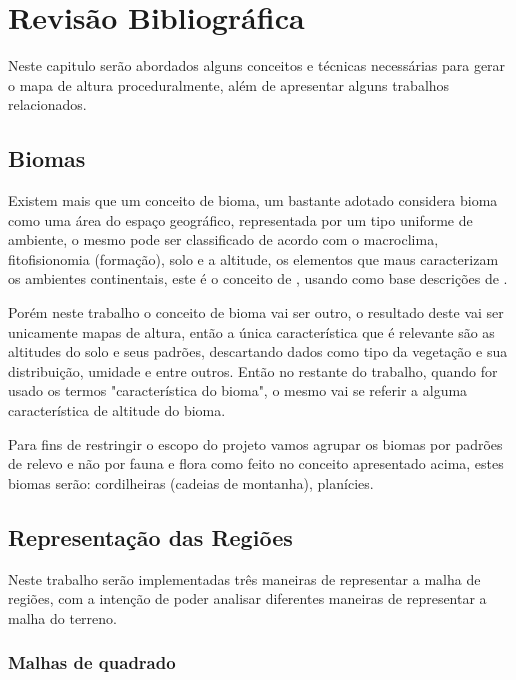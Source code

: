 \chapter{Revisão Bibliográfica}
Neste capitulo serão abordados alguns conceitos e técnicas necessárias para
gerar o mapa de altura proceduralmente, além de apresentar alguns trabalhos
relacionados.

\section{Biomas} %
Existem mais que um conceito de bioma, um bastante adotado considera bioma como
uma área do espaço geográfico, representada por um tipo uniforme de ambiente, o
mesmo pode ser classificado de acordo com o macroclima, fitofisionomia (formação),
solo e a altitude, os elementos que maus caracterizam os ambientes continentais, 
este é o conceito de \cite{coutinho2006conceito}, usando como base descrições
de \cite{walter1986vegetaccao}.

Porém neste trabalho o conceito de bioma vai ser outro, o resultado deste
vai ser unicamente mapas de altura, então a única característica que é relevante
são as altitudes do solo e seus padrões, descartando dados como tipo da
vegetação e sua distribuição, umidade e entre outros. Então no restante 
do trabalho, quando for usado os termos "característica do bioma", o mesmo vai
se referir a alguma característica de altitude do bioma.

Para fins de restringir o escopo do projeto vamos agrupar os biomas por padrões
de relevo e não por fauna e flora como feito no conceito apresentado acima,
estes biomas serão: cordilheiras (cadeias de montanha), planícies.

\section{Representação das Regiões}
Neste trabalho serão implementadas três maneiras de representar a malha de
regiões, com a intenção de poder analisar diferentes maneiras de representar
a malha do terreno.
\subsection{Malhas de quadrado}

